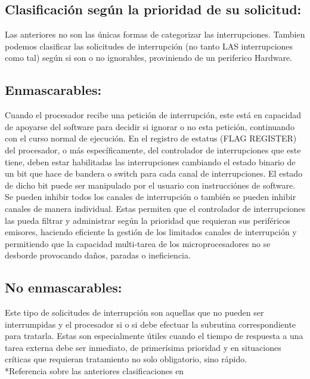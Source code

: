 \documentclass[12pt]{article}
\begin{document}
\begin{multicols}{2}
\section*{Clasificación según la prioridad de su solicitud:}
Las anteriores no son las únicas formas de categorizar las interrupciones. Tambien podemos clasificar las solicitudes de interrupción (no tanto LAS interrupciones como tal) según si son o no ignorables, proviniendo de un periferico Hardware.

\subsection*{Enmascarables:} 
Cuando el procesador recibe una petición de interrupción, este está en capacidad de apoyarse del software para decidir si ignorar o no esta petición, continuando con el curso normal de ejecución. En el registro de estatus (FLAG REGISTER) del procesador, o más específicamente, del controlador de interrupciones que este tiene, deben estar habilitadas las interrupciones cambiando el estado binario de un bit que hace de bandera o switch para cada canal de interrupciones. El estado de dicho bit puede ser manipulado por el usuario con instrucciónes de software. Se pueden inhibir todos los canales de interrupción o también se pueden inhibir canales de manera individual. Estas permiten que el controlador de interrupciones las pueda filtrar y administrar según la prioridad que requieran sus periféricos emisores, haciendo eficiente la gestión de los limitados canales de interrupción y permitiendo que la capacidad multi-tarea de los microprocesadores no se desborde provocando daños, paradas o ineficiencia.

\subsection*{No enmascarables:} 
Este tipo de solicitudes de interrupción son aquellas que no pueden ser interrumpidas y el procesador si o si debe efectuar la subrutina correspondiente para tratarla. Estas son especialmente útiles cuando el tiempo de respuesta a una tarea externa debe ser inmediato, de primerísima prioridad y en situaciones críticas que requieran tratamiento no solo obligatorio, sino rápido.\\[1 cm]
*Referencia sobre las anteriores clasificaciones en \cite{Bel}

\end{multicols}
\end{document}
